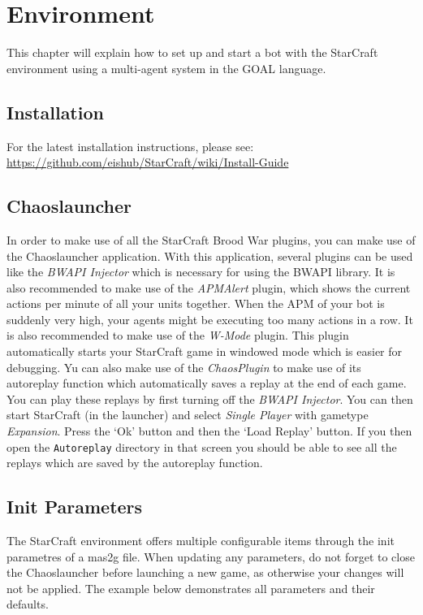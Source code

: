 \chapter{Environment}
This chapter will explain how to set up and start a bot with the StarCraft environment using a multi-agent system in the GOAL language.

\section{Installation}
For the latest installation instructions, please see: \\ \url{https://github.com/eishub/StarCraft/wiki/Install-Guide}

\section{Chaoslauncher}
In order to make use of all the StarCraft Brood War plugins, you can make use of the Chaoslauncher application. With this application, several plugins can be used like the \textit{BWAPI Injector} which is necessary for using the BWAPI library. It is also recommended to make use of the \textit{APMAlert} plugin, which shows the current actions per minute of all your units together. When the APM of your bot is suddenly very high, your agents might be executing too many actions in a row. It is also recommended to make use of the \textit{W-Mode} plugin. This plugin automatically starts your StarCraft game in windowed mode which is easier for debugging. Yu can also make use of the \textit{ChaosPlugin} to make use of its autoreplay function which automatically saves a replay at the end of each game. You can play these replays by first turning off the \textit{BWAPI Injector}. You can then start StarCraft (in the launcher) and select \textit{Single Player} with gametype \textit{Expansion}. Press the `Ok' button and then the `Load Replay' button. If you then open the
\texttt{Autoreplay} directory in that screen you should be able to see all the replays which are saved by the autoreplay function.

\section{Init Parameters}
\label{mas2g}
The StarCraft environment offers multiple configurable items through the init parametres of a mas2g file. When updating any parameters, do not forget to close the Chaoslauncher before launching a new game, as otherwise your changes will not be applied. The example below demonstrates all parameters and their defaults.

